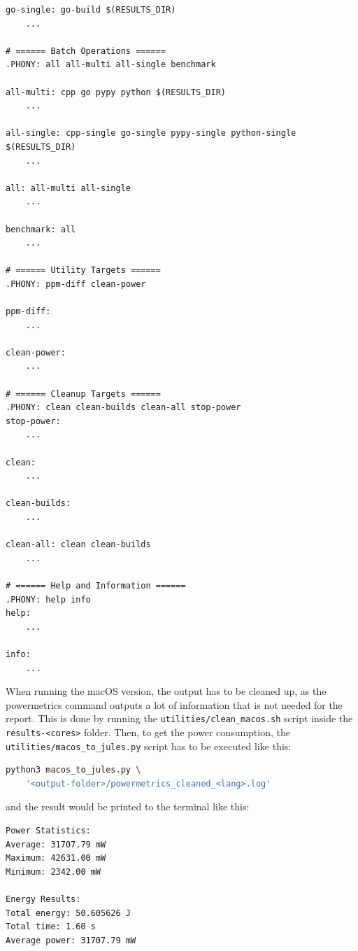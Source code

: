 \begin{lstlisting}[caption={Makefile for running the program.}, label={lst:makefile_run}]
go-single: go-build $(RESULTS_DIR)
	...
    
# ====== Batch Operations ======
.PHONY: all all-multi all-single benchmark

all-multi: cpp go pypy python $(RESULTS_DIR)
	...

all-single: cpp-single go-single pypy-single python-single $(RESULTS_DIR)
	...

all: all-multi all-single
	...

benchmark: all
	...

# ====== Utility Targets ======
.PHONY: ppm-diff clean-power

ppm-diff:
	...

clean-power:
	...

# ====== Cleanup Targets ======
.PHONY: clean clean-builds clean-all stop-power
stop-power:
	...

clean:
	...

clean-builds:
	...

clean-all: clean clean-builds
	...

# ====== Help and Information ======
.PHONY: help info
help:
	...

info:
	...
\end{lstlisting}

When running the macOS version, the output has to be cleaned up, as the powermetrics command outputs a lot of information that is not needed for the report. This is done by running the \texttt{utilities/clean\_macos.sh} script inside the \texttt{results-<cores>} folder. Then, to get the power consumption, the \texttt{utilities/macos\_to\_jules.py} script has to be executed like this:
\begin{lstlisting}[language=bash, caption={Running the power consumption script.}, label={lst:macos_power_script}]
python3 macos_to_jules.py \
    '<output-folder>/powermetrics_cleaned_<lang>.log'
\end{lstlisting}

and the result would be printed to the terminal like this:
\begin{lstlisting}[language=bash, caption={Power consumption output.}, label={lst:macos_power_output}]
Power Statistics:
Average: 31707.79 mW
Maximum: 42631.00 mW
Minimum: 2342.00 mW

Energy Results:
Total energy: 50.605626 J
Total time: 1.60 s
Average power: 31707.79 mW
\end{lstlisting}